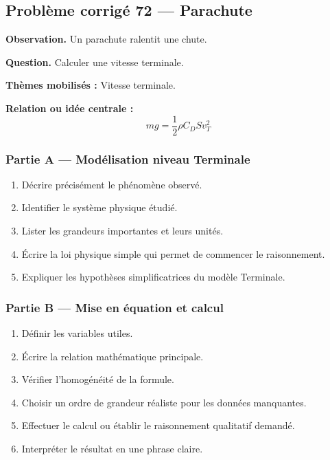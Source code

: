 \documentclass[11pt,a4paper]{article}
\begin{document}
\subsection{Problème corrigé 72 — Parachute}

\begin{exercicebox}
\textbf{Observation.} Un parachute ralentit une chute.

\medskip
\textbf{Question.} Calculer une vitesse terminale.

\medskip
\textbf{Thèmes mobilisés :} Vitesse terminale.

\medskip
\textbf{Relation ou idée centrale :}
\[
mg=\frac12\rho C_DSv_T^2
\]
\end{exercicebox}

\subsubsection*{Partie A — Modélisation niveau Terminale}

\begin{enumerate}
  \item Décrire précisément le phénomène observé.
  \item Identifier le système physique étudié.
  \item Lister les grandeurs importantes et leurs unités.
  \item Écrire la loi physique simple qui permet de commencer le raisonnement.
  \item Expliquer les hypothèses simplificatrices du modèle Terminale.
\end{enumerate}

\subsubsection*{Partie B — Mise en équation et calcul}

\begin{enumerate}
  \item Définir les variables utiles.
  \item Écrire la relation mathématique principale.
  \item Vérifier l'homogénéité de la formule.
  \item Choisir un ordre de grandeur réaliste pour les données manquantes.
  \item Effectuer le calcul ou établir le raisonnement qualitatif demandé.
  \item Interpréter le résultat en une phrase claire.
\end{enumerate}
\end{document}
